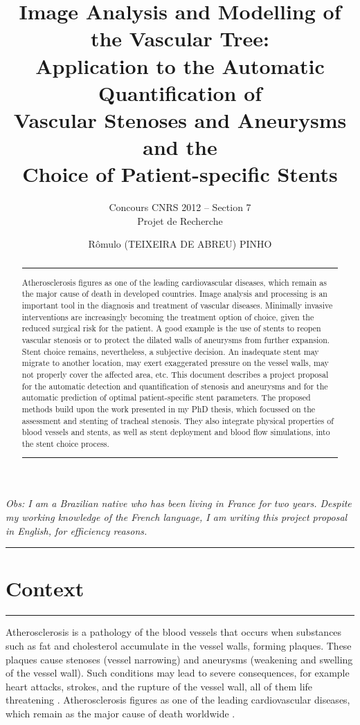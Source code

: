 \documentclass[a4paper]{article}
\title{Image Analysis and Modelling of the Vascular Tree:\\Application to the Automatic Quantification of\\Vascular Stenoses and Aneurysms and the\\Choice of Patient-specific Stents}
\author{Concours CNRS 2012 -- Section 7\\Projet de Recherche}
\date{R\^omulo (TEIXEIRA DE ABREU) PINHO}
\newcommand{\citep}{\cite}
\begin{document}
\maketitle

\begin{noindent}
{\em Obs: I am a Brazilian native who has been living in France for two years. Despite my working knowledge of the French language, I am writing this project proposal in English, for efficiency reasons.}
\end{noindent}

\begin{abstract}
\hrule
\medskip
Atherosclerosis figures as one of the leading cardiovascular diseases, which remain as the major cause of death in developed countries. Image analysis and processing is an important tool in the diagnosis and treatment of vascular diseases. Minimally invasive interventions are increasingly becoming the treatment option of choice, given the reduced surgical risk for the patient. A good example is the use of stents to reopen vascular stenosis or to protect the dilated walls of aneurysms from further expansion. Stent choice remains, nevertheless, a subjective decision. An inadequate stent may migrate to another location, may exert exaggerated pressure on the vessel walls, may not properly cover the affected area, etc. This document describes a project proposal for the automatic detection and quantification of stenosis and aneurysms and for the automatic prediction of optimal patient-specific stent parameters. The proposed methods build upon the work presented in my PhD thesis, which focussed on the assessment and stenting of tracheal stenosis. They also integrate physical properties of blood vessels and stents, as well as stent deployment and blood flow simulations, into the stent choice process. 
\medskip
\hrule
\end{abstract}


\tableofcontents

\pagebreak

\hrule
\section{Context}
\hrule

\medskip
\medskip

Atherosclerosis is a pathology of the blood vessels that occurs when substances such as fat and cholesterol accumulate in the vessel walls, forming plaques. These plaques cause stenoses (vessel narrowing) and aneurysms (weakening and swelling of the vessel wall). Such conditions may lead to severe consequences, for example heart attacks, strokes, and the rupture of the vessel wall, all of them life threatening \citep{Gennest,Libby}. Atherosclerosis figures as one of the leading cardiovascular diseases, which remain as the major cause of death worldwide \citep{WHO}. 
\end{document}
